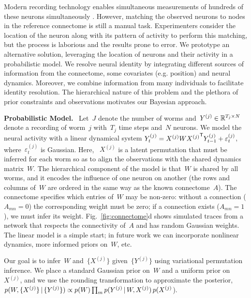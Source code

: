 \documentclass[twoside]{article}
\DeclareRobustCommand{\parhead}[1]{\textbf{#1}~}
\begin{document}
Modern recording technology enables simultaneous measurements of
hundreds of these neurons simultaneously \citep{Kato2015,
  nguyen2016whole}.  However, matching the observed neurons to nodes
in the reference connectome is still a manual task.  Experimenters
consider the location of the neuron along with its pattern of activity
to perform this matching, but the process is laborious and the results
prone to error. We prototype an alternative solution, leveraging the
location of neurons and their activity in a probabilistic model. We
resolve neural identity by integrating different sources of
information from the connectome, some covariates (e.g. position) and
neural dynamics. Moreover, we combine information from many
individuals to facilitate identity resolution.  The hierarchical
nature of this problem and the plethora of prior constraints and
observations motivates our Bayesian approach.

\parhead{Probabilistic Model.}  Let~$J$ denote the number of worms
and~${Y^{(j)} \in \mathbb{R}^{T_j \times N}}$ denote a recording of
worm~$j$ with~$T_j$ time steps and~$N$ neurons.  We model the neural
activity with a linear dynamical system
${Y^{(j)}_t = {X^{(j)}} W {X^{(j)}}^{\mathsf{T}}
  Y^{(j)}_{t-1}+\varepsilon^{(j)}_t}$, where~$\varepsilon_t^{(j)}$ is
Gaussian.  Here, ~$X^{(j)}$ is a latent permutation  that must be inferred for each worm so as to align the observations
with the shared dynamics matrix~$W$.  The hierarchical component of
the model is that~$W$ is shared by all worms, and it encodes the
influence of one neuron on another (the rows and columns of~$W$ are
ordered in the same way as the known connectome~$A$). The connectome
specifies which entries of~$W$ may be non-zero: without a connection
(${A_{mn}=0}$) the corresponding weight must be zero; if a connection
exists (${A_{mn}=1}$), we must infer its weight.
Fig.~\ref{fig:connectome}d shows simulated traces from a network that
respects the connectivity of~$A$ and has random Gaussian weights.  The
linear model is a simple start; in future work we can incorporate
nonlinear dynamics, more informed priors on~$W$, etc.

Our goal is to infer~$W$ and~$\{X^{(j)}\}$ given~$\{Y^{(j)}\}$ using
variational permutation inference.  We place a standard Gaussian prior
on~$W$ and a uniform prior on~$X^{(j)}$, and we use the rounding
transformation to approximate the posterior,
$p(W,\{X^{(j)}\} \, | \, \{Y^{(j)}\})\propto p(W) \prod_m p(Y^{(j)}
\, | \, W, {X^{(j)}}) \, p({X^{(j)}}$).
\end{document}

